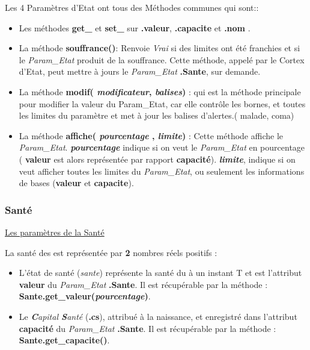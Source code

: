 \documentclass[french]{report}
\newlength{\du}\fi
\begin{document}
Les 4 Paramètres d'Etat ont tous des Méthodes communes qui sont::\\

\begin{itemize}
	\item Les méthodes \textbf{get\_} et \textbf{set\_} sur \textbf{.valeur}, \textbf{.capacite} et \textbf{.nom} .\\
	
	\item La méthode \textbf{souffrance()}: Renvoie \textit{Vrai} si des limites ont été franchies et si le \textit{Param\_Etat} produit de la souffrance. Cette méthode, appelé par le Cortex d'Etat, peut mettre à jours le \textit{Param\_Etat} \textbf{.Sante}, sur demande.\\
	
	\item La méthode \textbf{modif( \textit{modificateur}, \textit{balises})} : qui est la méthode principale pour modifier la valeur du Param\_Etat, car elle contrôle les bornes, et toutes les limites du paramètre et met à jour les balises d'alertes.( malade, coma)\\
	
	\item La méthode \textbf{affiche( \textit{pourcentage} , \textit{limite})} : Cette méthode affiche le \textit{Param\_Etat}. \textbf{\textit{pourcentage}} indique si on veut le \textit{Param\_Etat} en pourcentage ( \textbf{valeur} est alors représentée par rapport \textbf{capacité}). \textbf{\textit{limite}}, indique si on veut afficher toutes les limites du \textit{Param\_Etat}, ou seulement les informations de bases (\textbf{valeur} et \textbf{capacite}).\\
	
\end{itemize}
\subsubsection{Santé}\label{sante}
\begin{center}
	
\underline{Les paramètres de la Santé}

\end{center}
La santé des \CoCiX est représentée par \textbf{2} nombres réels positifs :\\
\begin{itemize}
\item L'état de santé (\textit{sante}) représente la santé du \CoCiX à un instant T et est l'attribut \textbf{valeur} du \textit{Param\_Etat} \textbf{.Sante}. Il est récupérable par la méthode : \textbf{Sante.get\_valeur(\textit{pourcentage})}.\\
\item Le \textit{\textbf{C}apital \textbf{S}anté} (\textbf{.cs}), attribué à la naissance, et enregistré dans l'attribut \textbf{capacité} du \textit{Param\_Etat} \textbf{.Sante}. Il est récupérable par la méthode : \textbf{Sante.get\_capacite()}.\\
\end{itemize}
\end{document}
